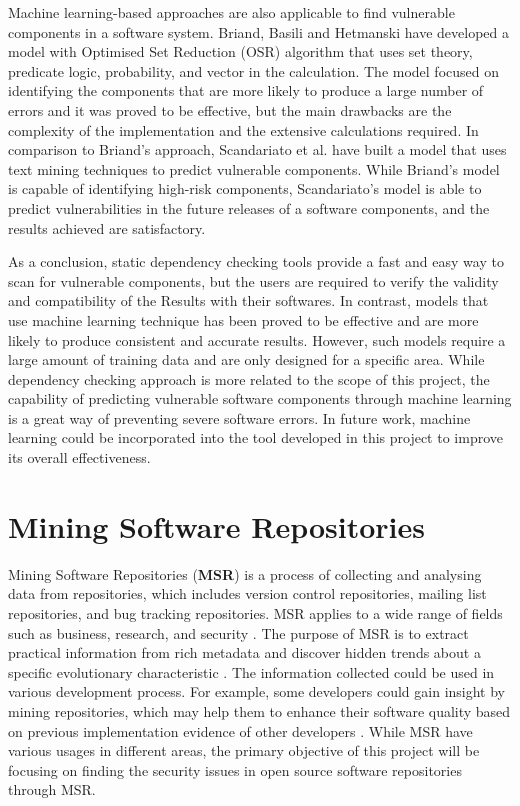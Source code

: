 \documentclass[12pt, a4paper]{report}
\begin{document}
Machine learning-based approaches are also applicable to find vulnerable components in a software
system. Briand, Basili and Hetmanski \cite{briand_1993} have developed a model with Optimised Set
Reduction (OSR) algorithm that uses set theory, predicate logic, probability, and vector in the
calculation. The model focused on identifying the components that are more likely to produce a large
number of errors and it was proved to be effective, but the main drawbacks are the complexity of the
implementation and the extensive calculations required. In comparison to Briand's approach,
Scandariato et al. \cite{scandariato_2014} have built a model that uses text mining techniques to
predict vulnerable components. While Briand's model is capable of identifying high-risk components,
Scandariato's model is able to predict vulnerabilities in the future releases of a software
components, and the results achieved are satisfactory.

As a conclusion, static dependency checking tools provide a fast and easy way to scan for vulnerable
components, but the users are required to verify the validity and compatibility of the Results with
their softwares. In contrast, models that use machine learning technique has been proved to be
effective and are more likely to produce consistent and accurate results. However, such models
require a large amount of training data and are only designed for a specific area. While dependency
checking approach is more related to the scope of this project, the capability of predicting
vulnerable software components through machine learning is a great way of preventing severe software
errors. In future work, machine learning could be incorporated into the tool developed in this
project to improve its overall effectiveness.

\section{Mining Software Repositories}
Mining Software Repositories (\textbf{MSR}) is a process of collecting and analysing data from
repositories, which includes version control repositories, mailing list repositories, and bug
tracking repositories. MSR applies to a wide range of fields such as business, research, and
security \cite{poncin_2011}. The purpose of MSR is to extract practical information from rich
metadata and discover hidden trends about a specific evolutionary characteristic \cite{kagdi_2007}.
The information collected could be used in various development process. For example, some developers
could gain insight by mining repositories, which may help them to enhance their software quality
based on previous implementation evidence of other developers \cite{hassan_2008}. While MSR have
various usages in different areas, the primary objective of this project will be focusing on finding
the security issues in open source software repositories through MSR.
\end{document}
